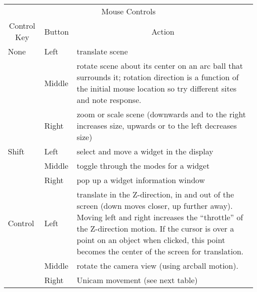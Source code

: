 \begin{center}
  \begin{tabular}{|l|l|p{3in}|} \hline
    \multicolumn{3}{|c|}{Mouse Controls}\\
    \multicolumn{1}{|c|}{Control Key} & 
    \multicolumn{1}{|c|}{Button} & 
    \multicolumn{1}{|c|}{Action}\\ \hline
None & Left & translate scene \\
     & Middle & rotate scene about its center on an arc ball
    that surrounds it; rotation direction is a function of the
    initial mouse location so try different sites and note response. \\ 
     & Right & zoom or scale scene (downwards and to the right increases
     size, upwards or to the left decreases size) \\ 
Shift & Left & select and move a widget in the display \\
      & Middle & toggle through the modes for a widget \\
      & Right & pop up a widget information window \\ \hline
Control & Left & translate in the Z-direction, \ie{} in and out of the
    screen (down moves closer, up further away).  Moving left and
    right increases the ``throttle'' of the Z-direction motion.  If
    the cursor is over a point on an object when clicked, this point
    becomes the center of the screen for translation.\\ 
      & Middle & rotate the camera view (using arcball motion). \\
      & Right & Unicam movement (see next table)\\ \hline
\end{tabular}

\bigskip


\end{center}
